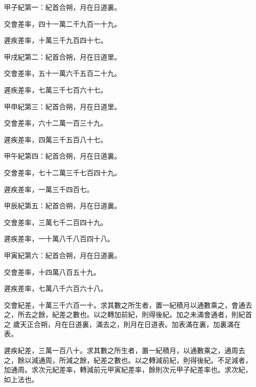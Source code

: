\begin{pinyinscope}
 甲子紀第一：紀首合朔，月在日道裏。



 交會差率，四十一萬二千九百一十九。



 遲疾差率，十萬三千九百四十七。



 甲戌紀第二：紀首合朔，月在日道里。



 交會差率，五十一萬六千五百二十九。



 遲疾差率，七萬三千七百六十七。



 甲申紀第三：紀首合朔，月在日道里。



 交會差率，六十二萬一百三十九。



 遲疾差率，四萬三千五百八十七。



 甲午紀第四：紀首合朔，月在日道裏。



 交會差率，七十二萬三千七百四十九。



 遲疾差率，一萬三千四百七。



 甲辰紀第五：紀首合朔，月在日道裏。



 交會差率，三萬七千二百四十九。



 遲疾差率，一十萬八千八百四十八。



 甲寅紀第六：紀首合朔，月在日道裏。



 交會差率，十四萬八百五十九。



 遲疾差率，七萬八千六百六十八。



 交會紀差，十萬三千六百一十。求其數之所生者，置一紀積月以通數乘之，會通去之，所去之餘，紀差之數也。以之轉加前紀，則得後紀。加之未滿會通者，則紀首之
 歲天正合朔，月在日道裏，滿去之，則月在日道表。加表滿在裏，加裏滿在表。



 遲疾紀差，三萬一百八十。求其數之所生者，置一紀積月，以通數乘之，通周去之，餘以減通周，所減之餘，紀差之數也。以之轉減前紀，則得後紀。不足減者，加通周。求次元紀差率，轉減前元甲寅紀差率，餘則次元甲子紀差率也。求次紀，如上法也。




\end{pinyinscope}
